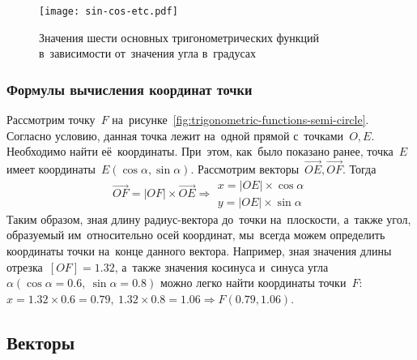 \documentclass[]{scrartcl}
\begin{document}
\begin{figure}[ht]
	\centering %
	\texttt{[image: sin-cos-etc.pdf]}
	\caption{Значения шести основных тригонометрических функций в~зависимости от~значения угла в~градусах}\label{fig:sin-cos-etc}
\end{figure}
\subsubsection{Формулы вычисления координат точки}
Рассмотрим точку~${\textstyle F}$ на~рисунке~\ref{fig:trigonometric-functions-semi-circle}. Согласно условию, данная точка лежит на~одной прямой с~точками~${\textstyle O,E}$. Необходимо найти её~координаты. При~этом, как~было показано ранее, точка~${\textstyle E}$ имеет координаты~${\textstyle E(\cos \alpha, \sin \alpha)}$. Рассмотрим векторы~${\textstyle \vec{OE}, \vec{OF}}$. Тогда
\begin{equation}\label{eq:point-coordinates}
\vec{OF}=|OF|\times \vec{OE} \Rightarrow
\begin{aligned}
x=|OE|\times \cos \alpha\\
y=|OE|\times \sin \alpha
\end{aligned}
\end{equation}
Таким образом, зная длину радиус-вектора до~точки на~плоскости, а~также угол, образуемый им~относительно осей координат, мы~всегда можем определить координаты точки на~конце данного вектора. Например, зная значения длины отрезка~${\textstyle [OF]=1.32}$, а~также значения косинуса и~синуса угла~${\textstyle \alpha (\cos \alpha = 0.6,\ \sin \alpha =0.8)}$ можно легко найти координаты точки~${\textstyle F}$: ${\textstyle x=1.32 \times 0.6=0.79,\ 1.32 \times 0.8=1.06 \Rightarrow F(0.79,1.06)}$.



\subsection{Векторы}
\end{document}
